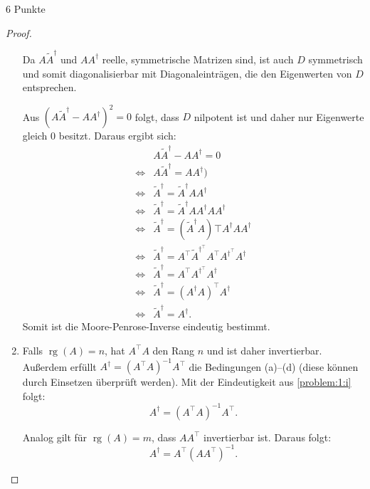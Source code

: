 \documentclass{problemset}
\begin{document}
\begin{problem}{6 Punkte}
\begin{proof}
\begin{enumerate}
              Da \( A \tilde{A}^\dagger \) und \( A A^\dagger \) reelle,
              symmetrische Matrizen sind, ist auch \( D \) symmetrisch und
              somit diagonalisierbar mit Diagonaleinträgen, die den Eigenwerten
              von \( D \) entsprechen.

              Aus \((A \tilde{A}^\dagger - A A^\dagger)^2 = 0\) folgt, dass \(
              D \) nilpotent ist und daher nur Eigenwerte gleich \( 0 \)
              besitzt. Daraus ergibt sich:
              \begin{align*}
                       & A \tilde{A}^\dagger - A A^\dagger = 0                                                   \\
                  \iff & A \tilde{A}^\dagger = A A^\dagger)                                                      \\
                  \iff & \tilde{A}^\dagger = \tilde{A}^\dagger A A^\dagger                                       \\
                  \iff & \tilde{A}^\dagger = \tilde{A}^\dagger A A^\dagger A A^\dagger                           \\
                  \iff & \tilde{A}^\dagger = {(\tilde{A}^\dagger A)}^{}\top A^\dagger A A^\dagger                \\
                  \iff & \tilde{A}^\dagger = A^\top {\tilde{A}}^{\dagger^\top} A^\top A^{\dagger^\top} A^\dagger \\
                  \iff & \tilde{A}^\dagger = A^\top A^{\dagger^\top} A^\dagger                                   \\
                  \iff & \tilde{A}^\dagger = {(A^\dagger A)}^\top A^\dagger                                      \\
                  \iff & \tilde{A}^\dagger = A^\dagger.
              \end{align*}
              Somit ist die Moore-Penrose-Inverse eindeutig bestimmt.

        \item Falls \( \operatorname{rg}(A) = n \), hat \( A^\top A \) den Rang
              \( n \) und ist daher invertierbar. Außerdem erfüllt \( A^\dagger
              = (A^\top A)^{-1} A^\top \) die Bedingungen (a)–(d) (diese können
              durch Einsetzen überprüft werden). Mit der Eindeutigkeit aus
              \ref{problem:1:i} folgt:
              \[
                  A^\dagger = (A^\top A)^{-1} A^\top.
              \]

              Analog gilt für \( \operatorname{rg}(A) = m \), dass \( A A^\top
              \) invertierbar ist. Daraus folgt:
              \[
                  A^\dagger = A^\top (A A^\top)^{-1}.
              \]


\end{enumerate}
\end{proof}
\end{problem}
\end{document}
